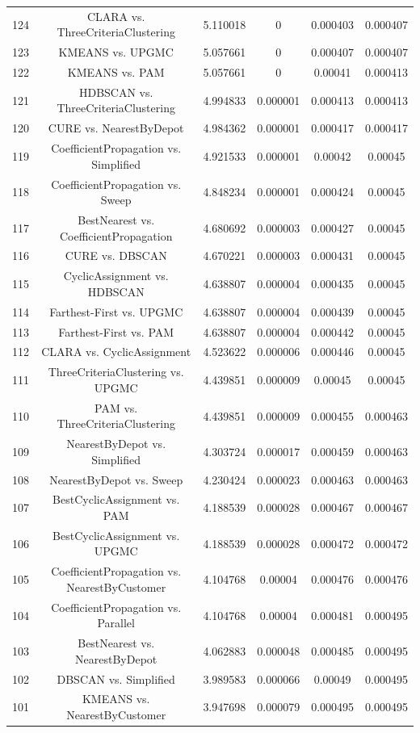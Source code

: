 \documentclass[a4paper,10pt]{article}
\begin{document}
\begin{landscape}
\begin{table}[!htp]
\begin{tabular}{cccccc}
124&CLARA vs. ThreeCriteriaClustering&5.110018&0&0.000403&0.000407\\
123&KMEANS vs. UPGMC&5.057661&0&0.000407&0.000407\\
122&KMEANS vs. PAM&5.057661&0&0.00041&0.000413\\
121&HDBSCAN vs. ThreeCriteriaClustering&4.994833&0.000001&0.000413&0.000413\\
120&CURE vs. NearestByDepot&4.984362&0.000001&0.000417&0.000417\\
119&CoefficientPropagation vs. Simplified&4.921533&0.000001&0.00042&0.00045\\
118&CoefficientPropagation vs. Sweep&4.848234&0.000001&0.000424&0.00045\\
117&BestNearest vs. CoefficientPropagation&4.680692&0.000003&0.000427&0.00045\\
116&CURE vs. DBSCAN&4.670221&0.000003&0.000431&0.00045\\
115&CyclicAssignment vs. HDBSCAN&4.638807&0.000004&0.000435&0.00045\\
114&Farthest-First vs. UPGMC&4.638807&0.000004&0.000439&0.00045\\
113&Farthest-First vs. PAM&4.638807&0.000004&0.000442&0.00045\\
112&CLARA vs. CyclicAssignment&4.523622&0.000006&0.000446&0.00045\\
111&ThreeCriteriaClustering vs. UPGMC&4.439851&0.000009&0.00045&0.00045\\
110&PAM vs. ThreeCriteriaClustering&4.439851&0.000009&0.000455&0.000463\\
109&NearestByDepot vs. Simplified&4.303724&0.000017&0.000459&0.000463\\
108&NearestByDepot vs. Sweep&4.230424&0.000023&0.000463&0.000463\\
107&BestCyclicAssignment vs. PAM&4.188539&0.000028&0.000467&0.000467\\
106&BestCyclicAssignment vs. UPGMC&4.188539&0.000028&0.000472&0.000472\\
105&CoefficientPropagation vs. NearestByCustomer&4.104768&0.00004&0.000476&0.000476\\
104&CoefficientPropagation vs. Parallel&4.104768&0.00004&0.000481&0.000495\\
103&BestNearest vs. NearestByDepot&4.062883&0.000048&0.000485&0.000495\\
102&DBSCAN vs. Simplified&3.989583&0.000066&0.00049&0.000495\\
101&KMEANS vs. NearestByCustomer&3.947698&0.000079&0.000495&0.000495\\

\end{tabular}
\end{table}
\end{landscape}
\end{document}
